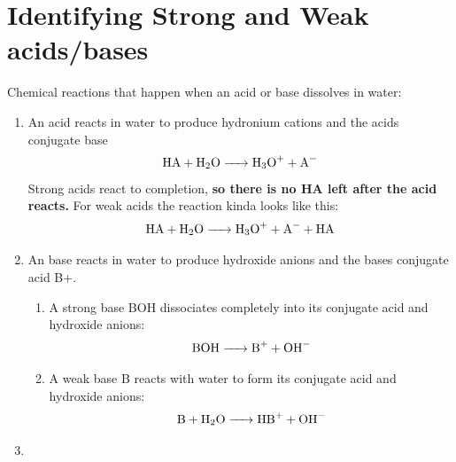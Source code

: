 \documentclass{article}  %
\begin{document}
\section*{Identifying Strong and Weak acids/bases}
Chemical reactions that happen when an acid or base dissolves in water:
\begin{enumerate}
    \item An acid reacts in water to produce hydronium  cations and the acids conjugate base 
    \begin{equation}
        \ce{HA + H2O -> H3O+ + A-}
    \end{equation}
    Strong acids react to completion, \textbf{so there is no HA left after the acid reacts.}
    For weak acids the reaction kinda looks like this:
    \begin{equation}
        \ce{HA + H2O -> H3O+ + A- + HA}
    \end{equation}
    \item An base reacts in water to produce hydroxide  anions and the bases conjugate acid B+. 
    \begin{enumerate}
        \item A strong base BOH dissociates completely into its conjugate acid  and hydroxide  anions:
        \begin{equation*}
            \begin{aligned}
                \ce{BOH -> B+ + OH-}
            \end{aligned}
        \end{equation*}
        \item A weak base B reacts with water to form its conjugate acid  and hydroxide anions:
        \begin{equation*}
            \begin{aligned}
                \ce{B + H2O -> HB+ + OH-}
            \end{aligned}
        \end{equation*}
    \end{enumerate}
    \item 
\end{enumerate}
\end{document}
